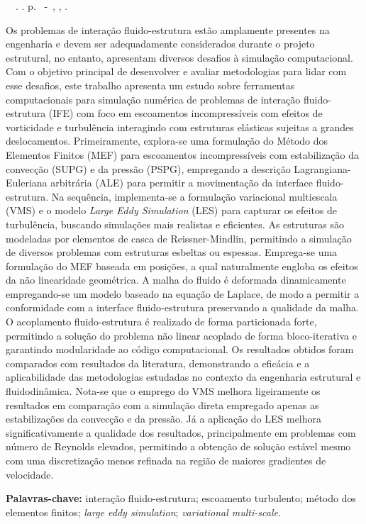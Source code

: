 \setlength{\absparsep}{18pt} %
\begin{resumo}
	\begin{flushleft}
		\setlength{\absparsep}{0pt} %
		\SingleSpacing
		\imprimirautorabr~~\textbf{\imprimirtituloresumo}.	\imprimirdata. \pageref{LastPage} p.
		\imprimirtipotrabalho~-~\imprimirinstituicao, \imprimirlocal, \imprimirdata.
	\end{flushleft}
	\OnehalfSpacing

	Os problemas de interação fluido-estrutura estão amplamente presentes na engenharia e devem ser adequadamente considerados durante o projeto estrutural, no entanto, apresentam diversos desafios à simulação computacional. Com o objetivo principal de desenvolver e avaliar metodologias para lidar com esse desafios, este trabalho apresenta um estudo sobre ferramentas computacionais para simulação numérica de problemas de interação fluido-estrutura (IFE) com foco em escoamentos incompressíveis com efeitos de vorticidade e  turbulência interagindo com estruturas elásticas sujeitas a grandes deslocamentos. Primeiramente, explora-se uma formulação do Método dos Elementos Finitos (MEF) para escoamentos incompressíveis com estabilização da convecção (SUPG) e da pressão (PSPG), empregando a descrição Lagrangiana-Euleriana arbitrária (ALE) para permitir a movimentação da interface fluido-estrutura. Na sequência, implementa-se a formulação variacional multiescala (VMS) e o modelo \textit{Large Eddy Simulation} (LES) para capturar os efeitos de turbulência, buscando simulações mais realistas e eficientes. As estruturas são modeladas por elementos de casca de Reissner-Mindlin, permitindo a simulação de diversos problemas com estruturas esbeltas ou espessas. Emprega-se uma formulação do MEF baseada em posições, a qual naturalmente engloba os efeitos da não linearidade geométrica. A malha do fluido é deformada dinamicamente empregando-se um modelo baseado na equação de Laplace, de modo a permitir a conformidade com a interface fluido-estrutura preservando a qualidade da malha. O acoplamento fluido-estrutura é realizado de forma particionada forte, permitindo a solução do problema não linear acoplado de forma bloco-iterativa e garantindo modularidade ao código computacional. Os resultados obtidos foram comparados com resultados da literatura, demonstrando a eficácia e a aplicabilidade das metodologias estudadas no contexto da engenharia estrutural e fluidodinâmica. Nota-se que o emprego do VMS melhora ligeiramente os resultados em comparação com a simulação direta empregado apenas as estabilizações da convecção e da pressão.  Já a aplicação do LES melhora significativamente a qualidade dos resultados, principalmente em problemas com número de Reynolds elevados, permitindo a obtenção de solução estável mesmo com uma discretização menos refinada  na região de maiores gradientes de velocidade.

	\textbf{Palavras-chave:} interação fluido-estrutura; escoamento turbulento; método dos elementos finitos; \textit{large eddy simulation}; \textit{variational multi-scale}.
\end{resumo}